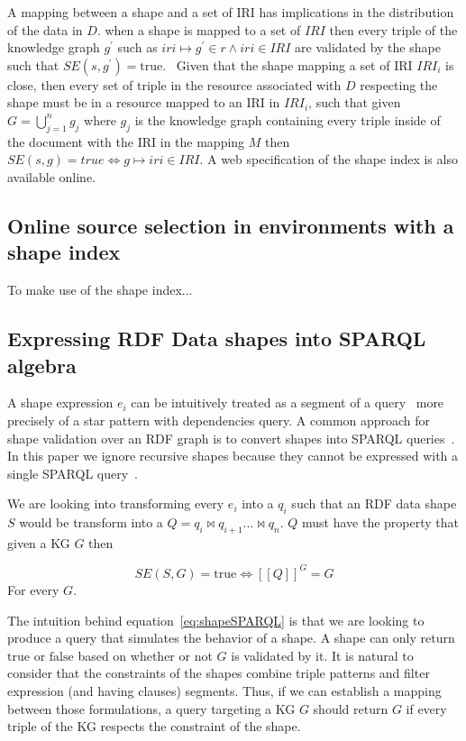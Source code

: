 A mapping between a shape and a set of IRI has implications in the distribution of the data in $D$.
when a shape is mapped to a set of $IRI$ then every triple of the knowledge graph $g^{\prime}$ such as $iri \mapsto g^{\prime} \in r \land iri \in IRI$
are validated by the shape such that $SE(s, g^{\prime}) = \text{true}$.~
Given that the shape mapping a set of IRI $IRI_i$ is close, then every set of triple in the resource associated with $D$ respecting the shape must be in a resource mapped to an IRI in $IRI_i$, 
such that given $G = \bigcup\limits_{j=1}^{n} g_j$ where $g_j$ is the knowledge graph containing every triple inside of the document with the IRI in the mapping $M$
then $SE(s, g) = true \iff g \mapsto iri \in IRI$.
A web specification of the shape index is also available online.~

\subsection{Online source selection in environments with a shape index}
To make use of the shape index...

\subsection{Expressing RDF Data shapes into SPARQL algebra}

\iffalse
LET CHANGE THE ARGUMENT SO THAT WE CONSIDER OPEN SHAPES AS SPO QUERY
\fi

A shape expression $e_i$ can be intuitively treated as a segment of a query~\cite{delva2023} more precisely of a star pattern with dependencies query.
A common approach for shape validation over an RDF graph is to convert shapes into SPARQL queries~\cite{labragayo2017validatingdescribinglinkeddata, Corman2019, spapeExpressionConvert}.
In this paper we ignore recursive shapes because they cannot be expressed with a single SPARQL query~\cite{Corman2019}. 

We are looking into transforming every $e_i$ into a $q_i$ such that an RDF data shape $S$ would be transform into a $Q = q_i \bowtie q_{i+1} ... \bowtie q_n$.
$Q$ must have the property that given a KG $G$ then 

\begin{equation}\label{eq:shapeSPARQL}
   SE(S,G) = \mathrm{true} \iff [\![ Q ]\!]^{G} =  G
\end{equation}
For every $G$.

The intuition behind equation~\ref{eq:shapeSPARQL} is that we are looking to produce a query that simulates the behavior of a shape.
A shape can only return $\mathrm{true}$ or $\mathrm{false}$ based on whether or not $G$ is validated by it.
It is natural to consider that the constraints of the shapes combine triple patterns and filter expression (and having clauses) segments.
Thus, if we can establish a mapping between those formulations, a query targeting a KG $G$ should return $G$ if every triple of the 
KG respects the constraint of the shape.

